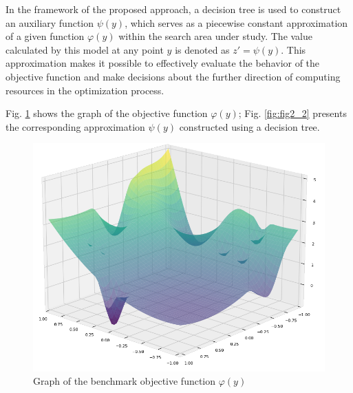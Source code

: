 \documentclass[runningheads]{llncs}
\begin{document}
In the framework of the proposed approach, a decision tree is used to construct an auxiliary function $\psi(y)$, which serves as a piecewise constant approximation of a given function $\varphi(y)$ within the search area under study. The value calculated by this model at any point $y$ is denoted as $z' = \psi(y)$. This approximation makes it possible to effectively evaluate the behavior of the objective function and make decisions about the further direction of computing resources in the optimization process.





Fig. \ref{fig:fig2} shows the graph of the objective function $\varphi(y)$; Fig. \ref{fig:fig2_2} presents the corresponding approximation $\psi(y)$ constructed using a decision tree.
\begin{figure}
	\begin{center}
		\begin{minipage}[h]{0.75\linewidth}
			\includegraphics[width=1\linewidth]{figure/fig5.png}
			\caption{Graph of the benchmark objective function $\varphi(y)$} %
			\label{fig:fig2}
		\end{minipage}
	\end{center}
\end{figure}	
\end{document}
